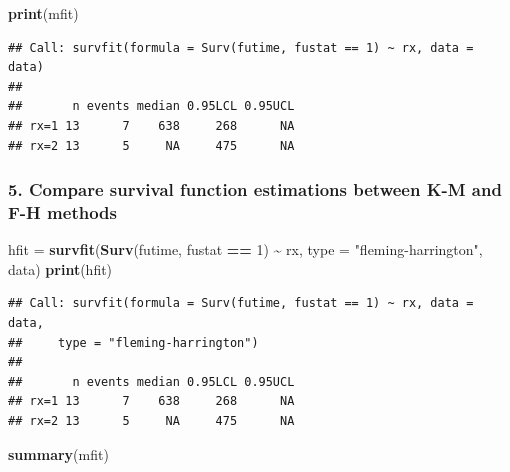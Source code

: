 \documentclass[
]{article}
\newenvironment{Shaded}{\begin{snugshade}}{\end{snugshade}}
\newcommand{\AttributeTok}[1]{\textcolor[rgb]{0.13,0.29,0.53}{#1}}
\newcommand{\DecValTok}[1]{\textcolor[rgb]{0.00,0.00,0.81}{#1}}
\newcommand{\FunctionTok}[1]{\textcolor[rgb]{0.13,0.29,0.53}{\textbf{#1}}}
\newcommand{\NormalTok}[1]{#1}
\newcommand{\OtherTok}[1]{\textcolor[rgb]{0.56,0.35,0.01}{#1}}
\newcommand{\SpecialCharTok}[1]{\textcolor[rgb]{0.81,0.36,0.00}{\textbf{#1}}}
\newcommand{\StringTok}[1]{\textcolor[rgb]{0.31,0.60,0.02}{#1}}
\begin{document}
\begin{Shaded}
\begin{Highlighting}[]
\FunctionTok{print}\NormalTok{(mfit)}
\end{Highlighting}
\end{Shaded}

\begin{verbatim}
## Call: survfit(formula = Surv(futime, fustat == 1) ~ rx, data = data)
## 
##       n events median 0.95LCL 0.95UCL
## rx=1 13      7    638     268      NA
## rx=2 13      5     NA     475      NA
\end{verbatim}

\hypertarget{compare-survival-function-estimations-between-k-m-and-f-h-methods}{%
\subsubsection{5. Compare survival function estimations between K-M and
F-H
methods}\label{compare-survival-function-estimations-between-k-m-and-f-h-methods}}

\begin{Shaded}
\begin{Highlighting}[]
\NormalTok{hfit }\OtherTok{=} \FunctionTok{survfit}\NormalTok{(}\FunctionTok{Surv}\NormalTok{(futime, fustat }\SpecialCharTok{==} \DecValTok{1}\NormalTok{) }\SpecialCharTok{\textasciitilde{}}\NormalTok{ rx, }\AttributeTok{type =} \StringTok{"fleming{-}harrington"}\NormalTok{, data)}
\FunctionTok{print}\NormalTok{(hfit)}
\end{Highlighting}
\end{Shaded}

\begin{verbatim}
## Call: survfit(formula = Surv(futime, fustat == 1) ~ rx, data = data, 
##     type = "fleming-harrington")
## 
##       n events median 0.95LCL 0.95UCL
## rx=1 13      7    638     268      NA
## rx=2 13      5     NA     475      NA
\end{verbatim}

\begin{Shaded}
\begin{Highlighting}[]
\FunctionTok{summary}\NormalTok{(mfit)}
\end{Highlighting}
\end{Shaded}
\end{document}

